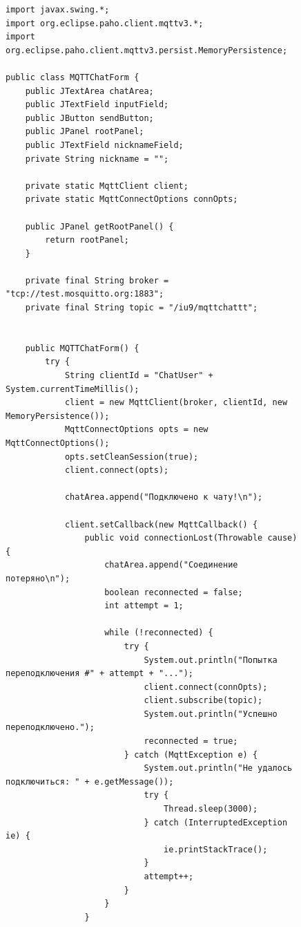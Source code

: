 \documentclass[a4paper, 14pt]{extarticle}
\begin{document}
\newpage

\begin{figure}[!htb]
\begin{lstlisting}[language={},caption={реализация MQTT чата},label={lst:code5}]
import javax.swing.*;
import org.eclipse.paho.client.mqttv3.*;
import org.eclipse.paho.client.mqttv3.persist.MemoryPersistence;

public class MQTTChatForm {
    public JTextArea chatArea;
    public JTextField inputField;
    public JButton sendButton;
    public JPanel rootPanel;
    public JTextField nicknameField;
    private String nickname = "";

    private static MqttClient client;
    private static MqttConnectOptions connOpts;

    public JPanel getRootPanel() {
        return rootPanel;
    }

    private final String broker = "tcp://test.mosquitto.org:1883";
    private final String topic = "/iu9/mqttchattt";


    public MQTTChatForm() {
        try {
            String clientId = "ChatUser" + System.currentTimeMillis();
            client = new MqttClient(broker, clientId, new MemoryPersistence());
            MqttConnectOptions opts = new MqttConnectOptions();
            opts.setCleanSession(true);
            client.connect(opts);

            chatArea.append("Подключено к чату!\n");

            client.setCallback(new MqttCallback() {
                public void connectionLost(Throwable cause) {
                    chatArea.append("Соединение потеряно\n");
                    boolean reconnected = false;
                    int attempt = 1;

                    while (!reconnected) {
                        try {
                            System.out.println("Попытка переподключения #" + attempt + "...");
                            client.connect(connOpts);
                            client.subscribe(topic);
                            System.out.println("Успешно переподключено.");
                            reconnected = true;
                        } catch (MqttException e) {
                            System.out.println("Не удалось подключиться: " + e.getMessage());
                            try {
                                Thread.sleep(3000);
                            } catch (InterruptedException ie) {
                                ie.printStackTrace();
                            }
                            attempt++;
                        }
                    }
                }


\end{lstlisting}
\end{figure}
\end{document}
